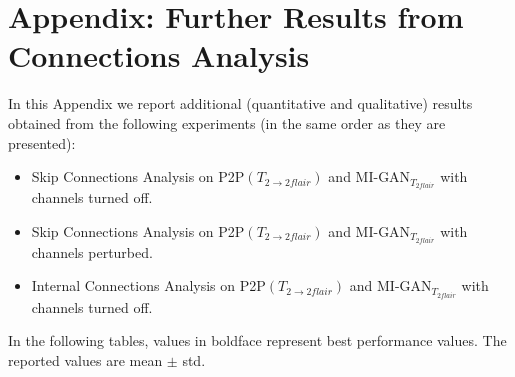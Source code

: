 \chapter{Appendix: Further Results from Connections Analysis}
\label{cha:first_appendix}

In this Appendix we report additional (quantitative and qualitative) results obtained from the following experiments (in the same order as they are presented): 

\begin{itemize}
\item Skip Connections Analysis on P2P$(T_{2 \rightarrow 2flair})$ and MI-GAN{$_{T_{2flair}}$} with channels turned off.
\item Skip Connections Analysis on P2P$(T_{2 \rightarrow 2flair})$ and MI-GAN{$_{T_{2flair}}$} with channels perturbed.
\item Internal Connections Analysis on P2P$(T_{2 \rightarrow 2flair})$ and MI-GAN{$_{T_{2flair}}$} with channels turned off.
\end{itemize}

\noindent In the following tables, values in boldface represent best performance values. The reported values are mean $\pm$ std.


